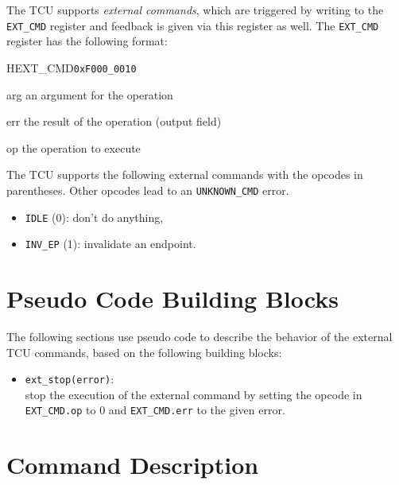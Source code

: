 The TCU supports \emph{external commands}, which are triggered by writing to the \texttt{EXT\_CMD}
register and feedback is given via this register as well. The \texttt{EXT\_CMD} register has the
following format:

\begin{register}{H}{EXT\_CMD}{\texttt{0xF000\_0010}}
  \regnewline%
  \begin{regdesc}\begin{reglist}
    \item[arg] an argument for the operation
    \item[err] the result of the operation (output field)
    \item[op] the operation to execute
  \end{reglist}\end{regdesc}
\end{register}

The TCU supports the following external commands with the opcodes in parentheses. Other opcodes lead
to an \texttt{UNKNOWN\_CMD} error.

\begin{itemize}
  \item \texttt{IDLE} (0): don't do anything,
  \item \texttt{INV\_EP} (1): invalidate an endpoint.
\end{itemize}

\section{Pseudo Code Building Blocks}
\label{sec:extcmdspseudo}

The following sections use pseudo code to describe the behavior of the external TCU commands, based
on the following building blocks:

\begin{itemize}
  \item \texttt{ext\_stop(error)}:\\
  stop the execution of the external command by setting the opcode in \texttt{EXT\_CMD.op} to 0 and
  \texttt{EXT\_CMD.err} to the given error.
\end{itemize}

\section{Command Description}

